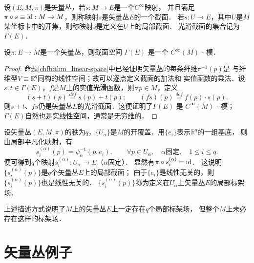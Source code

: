
\begin{definition}\label{chfb:def_vf-section}
    设$(E,M,\pi)$是矢量丛，若$s:M\to E$是一个$C^\infty$映射，
    并且满足$\pi \circ s \equiv {\rm id} :M\to M$，则称映射$s$是矢量丛$E$的一个{\heiti 截面}．
    若$s:U\to E$，其中$U$是$M$某坐标卡中的开集，则称映射$s$是定义在$U$上的{\heiti 局部截面}．
    光滑截面的集合记为$\Gamma(E)$．
\end{definition}

\begin{proposition}
    设$\pi: E \rightarrow M$是一个矢量丛，则截面空间 $\Gamma(E)$ 是一个 $C^{\infty}(M)$ - 模．
\end{proposition}

\begin{proof}
    命题\ref{chfb:thm_linear-space}中已经证明矢量丛的每条纤维$\pi^{-1}(p)$是
    与纤维型$V\equiv \mathbb{R}^q$同构的线性空间；故可以逐点定义截面的加法和
    实值函数的乘法．设$s,t\in \Gamma(E)$，$f$是$M$上的实值光滑函数，则$\forall p\in M$，定义
    \begin{equation}\label{chfb:eqn_spt}
        (s+t)(p)\overset{def}{=} s(p) + t(p);\qquad
        (fs)(p) \overset{def}{=} f(p) \cdot s(p) .
    \end{equation}
    则$s+t$、$fs$仍是矢量丛$E$的光滑截面．这便证明了$\Gamma(E)$ 是 $C^{\infty}(M)$ - 模；
    $\Gamma(E)$自然也是实线性空间，通常是无穷维的．
\end{proof}

设矢量丛$(E,M,\pi)$的秩为$q$，$\{U_\alpha\}$是$M$的开覆盖．用$\{e_i\}$表示$\mathbb{R}^q$的一组基底，
则由局部平凡化映射，有
\begin{equation}\label{chfb:eqn_spsie}
    s_i^{(\alpha)}(p) = \psi^{-1}_{\alpha}(p, e_i),\qquad \forall p\in U_\alpha,
    \quad \alpha \text{固定}, \quad 1 \leqslant i \leqslant q.
\end{equation}
便可得到$q$个映射$s_i^{(\alpha)} : U_\alpha \to E$（$\alpha$固定）．
显然有$\pi \circ s_i^{(\alpha)} ={\rm id}$．
这说明$\{s_i^{(\alpha)}(p)\}$是$q$个矢量丛$E$上的局部截面；
由于$\{e_i\}$是线性无关的，则$\{s_i^{(\alpha)}(p)\}$也是线性无关的．
$\{s_i^{(\alpha)}(p)\}$称为定义在$U_\alpha$上矢量丛$E$的{\heiti 局部标架场}．

上述描述方式说明了$M$上的矢量丛$E$上一定存在$q$个局部标架场，
但整个$M$上未必存在这样的标架场．




\section{矢量丛例子}

